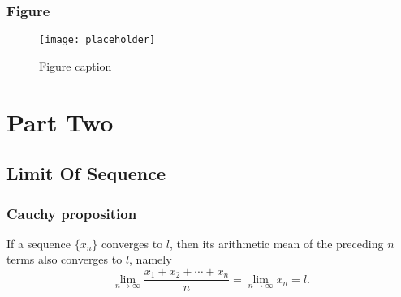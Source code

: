 \documentclass[11pt,fleqn]{book} %
\begin{document}

\section{Figure}

\begin{figure}[h]
\centering\texttt{[image: placeholder]}
\caption{Figure caption}
\end{figure}





\part{Part Two}


\chapter{Limit Of Sequence}

\section{Cauchy proposition}

\begin{theorem}
    If a sequence $\{x_n\}$ converges to $l$, then its arithmetic mean of the preceding $n$ terms also converges to $l$, namely
    \begin{equation}
    \lim\limits_{n\to\infty}\frac{x_1+x_2+\cdots+x_n}{n}=\lim\limits_{n\to\infty}x_n=l.
    \end{equation}
\end{theorem}
\end{document}
